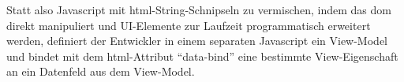 Statt also Javascript mit \gls{html}-String-Schnipseln zu vermischen, indem das \gls{dom} direkt manipuliert und UI-Elemente zur Laufzeit
programmatisch erweitert werden, definiert der Entwickler in einem separaten Javascript ein View-Model und bindet mit dem \gls{html}-Attribut \enquote{data-bind} eine bestimmte View-Eigenschaft an ein Datenfeld aus dem View-Model.

